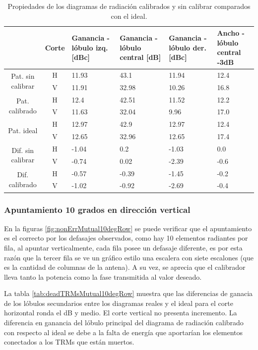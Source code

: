 \begin{table}[H]
  \footnotesize
  \centering
  \begin{tabular}{|c|c|p{2cm}|p{2.5cm}|p{2.5cm}|p{2.5cm}|}
    \cline{2-6}
    \multicolumn{1}{c|}{} & Corte & Ganancia - lóbulo izq. [dBc] & Ganancia - lóbulo central [dB] &
    Ganancia - lóbulo der. [dBc] & Ancho - lóbulo central -3dB \tabularnewline\hline
    \multirow{2}{2cm}{Pat. sin calibrar} & H & 11.93 & 43.1 & 11.94 & 12.4 \tabularnewline\cline{2-6}
     & V & 11.91 & 32.98 & 10.26 & 16.8 \tabularnewline\hline
    \multirow{2}{2cm}{Pat. calibrado} & H & 12.4 & 42.51 & 11.52 & 12.2 \tabularnewline\cline{2-6}
     & V & 11.63 & 32.04 & 9.96 & 17.0 \tabularnewline\hline
    \multirow{2}{2cm}{Pat. ideal} & H & 12.97 & 42.9 & 12.97 & 12.4 \tabularnewline\cline{2-6}
     & V & 12.65 & 32.96 & 12.65 & 17.4 \tabularnewline\hline
    \multirow{2}{2cm}{Dif. sin calibrar} & H & -1.04 & 0.2 & -1.03 & 0.0\tabularnewline\cline{2-6}
     & V & -0.74 & 0.02 & -2.39 & -0.6 \tabularnewline\hline
    \multirow{2}{2cm}{Dif. calibrado} & H & -0.57 & -0.39 & -1.45 & -0.2 \tabularnewline\cline{2-6}
     & V & -1.02 & -0.92 & -2.69 & -0.4 \tabularnewline\hline
  \end{tabular}
  \caption{Propiedades de los diagramas de radiación calibrados y sin calibrar comparados con el ideal.}
  \label{tab:deadTRMsMutual10degCol}
\end{table}


\subsubsection{Apuntamiento 10 grados en dirección vertical}

En la figuras \ref{fig:nonErrMutual10degRow} se puede verificar que el apuntamiento es el correcto por los defasajes observados, 
como hay 10 elementos radiantes por fila, al apuntar verticalmente, cada fila posee un defasaje diferente, es por esta razón que 
la tercer fila se ve un gráfico estilo una escalera con siete escalones (que es la cantidad de columnas de la antena). A su vez, 
se aprecia que el calibrador lleva tanto la potencia como la fase transmitida al valor deseado.

La tabla \ref{tab:deadTRMsMutual10degRow} muestra que las diferencias de ganacia de los lóbulos secundarios entre los diagramas 
reales y el ideal para el corte horizontal ronda el dB y medio. El corte vertical no presenta incremento. La diferencia en 
ganancia del lóbulo principal del diagrama de radiación calibrado con respecto al ideal se debe a la falta de energía que 
aportarían los elementos conectados a los TRMs que están muertos.

